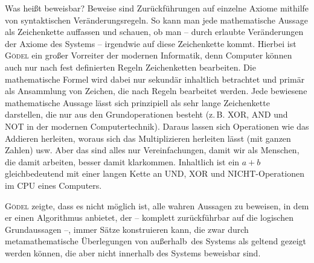 Was heißt \frq beweisbar\flq? Beweise sind Zurückführungen auf einzelne Axiome mithilfe
von syntaktischen Veränderungsregeln.
So kann man jede mathematische Aussage als Zeichenkette
auffassen und schauen, ob man -- durch erlaubte Veränderungen der Axiome des Systems --
irgendwie auf diese Zeichenkette kommt. Hierbei ist \textsc{Gödel} ein großer Vorreiter der
modernen Informatik, denn Computer können auch nur nach fest definierten Regeln
Zeichenketten bearbeiten. Die mathematische Formel wird dabei nur sekundär
inhaltlich
betrachtet und primär als Ansammlung von Zeichen, die nach Regeln bearbeitet werden.
Jede bewiesene mathematische Aussage lässt sich prinzipiell als sehr lange Zeichenkette
darstellen, die nur aus den Grundoperationen besteht (z.\,B. XOR, AND und NOT in
der modernen Computertechnik). Daraus lassen sich Operationen wie das Addieren
herleiten, woraus sich das Multiplizieren herleiten lässt (mit ganzen Zahlen) usw.
Aber das sind alles nur Vereinfachungen, damit wir als Menschen, die damit arbeiten,
besser damit klarkommen. Inhaltlich ist ein $a + b$ gleichbedeutend mit einer langen
Kette an UND, XOR und NICHT-Operationen im CPU eines Computers.

\textsc{Gödel} zeigte, dass es nicht möglich ist, alle wahren Aussagen zu beweisen,
in dem er einen Algorithmus anbietet, der -- komplett zurückführbar auf die logischen
Grundaussagen --, immer Sätze konstruieren kann, die zwar durch metamathematische
Überlegungen von \frq außerhalb\flq\ des Systems
als geltend gezeigt werden können, die aber nicht innerhalb des Systems beweisbar sind.

